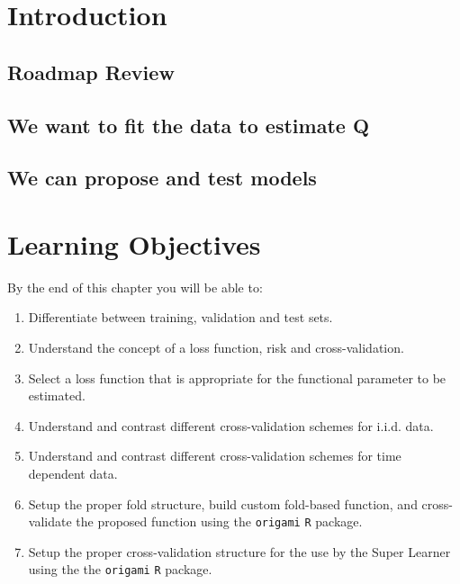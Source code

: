\documentclass[
  12pt, krantz2,
]{krantz}
\newcommand{\passthrough}[1]{#1}
\providecommand{\tightlist}{%
  \setlength{\itemsep}{0pt}\setlength{\parskip}{0pt}}
\theoremstyle{definition}
\theoremstyle{definition}
\theoremstyle{definition}
\newcommand{\1}{\mathbbm{1}}
\begin{document}
\hypertarget{introduction-1}{%
\section{Introduction}\label{introduction-1}}

\hypertarget{roadmap-review}{%
\subsection{Roadmap Review}\label{roadmap-review}}

\hypertarget{we-want-to-fit-the-data-to-estimate-q}{%
\subsection{We want to fit the data to estimate Q}\label{we-want-to-fit-the-data-to-estimate-q}}

\hypertarget{we-can-propose-and-test-models}{%
\subsection{We can propose and test models}\label{we-can-propose-and-test-models}}

\hypertarget{learning-objectives-1}{%
\section{Learning Objectives}\label{learning-objectives-1}}

By the end of this chapter you will be able to:

\begin{enumerate}
\def\labelenumi{\arabic{enumi}.}
\tightlist
\item
  Differentiate between training, validation and test sets.
\item
  Understand the concept of a loss function, risk and cross-validation.
\item
  Select a loss function that is appropriate for the functional parameter to be
  estimated.
\item
  Understand and contrast different cross-validation schemes for i.i.d. data.
\item
  Understand and contrast different cross-validation schemes for time dependent
  data.
\item
  Setup the proper fold structure, build custom fold-based function, and
  cross-validate the proposed function using the \passthrough{\lstinline!origami!} \passthrough{\lstinline!R!} package.
\item
  Setup the proper cross-validation structure for the use by the Super Learner
  using the the \passthrough{\lstinline!origami!} \passthrough{\lstinline!R!} package.
\end{enumerate}
\end{document}
